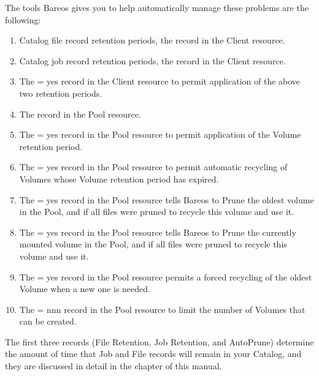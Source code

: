 The tools Bareos gives you to help automatically manage these problems are the
following:

\begin{enumerate}
\item Catalog file record retention periods, the
     record in the Client
   resource.
\item Catalog job record retention periods, the
     record in the Client
   resource.
\item The
    = yes record in the Client resource
   to permit  application of the above two retention periods.
\item The
    record in the Pool
   resource.
\item The
    = yes record in the Pool
   resource to permit  application of the Volume retention period.
\item The
    = yes record in the Pool resource
   to permit  automatic recycling of Volumes whose Volume retention period has
   expired.
\item The
    = yes record in the
   Pool resource tells Bareos  to Prune the oldest volume in the Pool, and if all
   files  were pruned to recycle this volume and use it.
\item The
    = yes record in
   the Pool resource tells Bareos  to Prune the currently mounted volume in the
   Pool, and if all files  were pruned to recycle this volume and use it.
\item The
    = yes record in the
   Pool resource  permits a forced recycling of the oldest Volume when a new one
   is  needed.\\
\item The
    = nnn record in the Pool
   resource to limit  the number of Volumes that can be created.
\end{enumerate}

The first three records (File Retention, Job Retention, and AutoPrune)
determine the amount of time that Job and File records will remain in your
Catalog, and they are discussed in detail in the
 chapter of
this manual.

